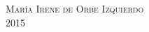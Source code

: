 \begin{titlepage}
\begin{center}
\vspace*{1cm} 
\textsc{María Irene de Orbe Izquierdo}
\vspace{0.5cm}
\hfill
\\
\textsc{2015}
        





    \end{center}      
\end{titlepage}   
\thispagestyle{empty}

